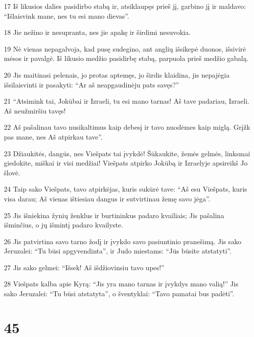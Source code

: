 \par 17 Iš likusios dalies pasidirbo stabą ir, atsiklaupęs prieš jį, garbino jį ir maldavo: “Išlaisvink mane, nes tu esi mano dievas”. 
\par 18 Jie nežino ir nesupranta, nes jie apakę ir širdimi nesuvokia. 
\par 19 Nė vienas nepagalvoja, kad pusę sudegino, ant anglių išsikepė duonos, išsivirė mėsos ir pavalgė. Iš likusio medžio pasidirbę stabą, parpuola prieš medžio gabalą. 
\par 20 Jis maitinasi pelenais, jo protas aptemęs, jo širdis klaidina, jis nepajėgia išsilaisvinti ir pasakyti: “Ar aš neapgaudinėju pats savęs?” 
\par 21 “Atsimink tai, Jokūbai ir Izraeli, tu esi mano tarnas! Aš tave padariau, Izraeli. Aš neužmiršiu tavęs! 
\par 22 Aš pašalinau tavo nusikaltimus kaip debesį ir tavo nuodėmes­ kaip miglą. Grįžk pas mane, nes Aš atpirkau tave”. 
\par 23 Džiaukitės, dangūs, nes Viešpats tai įvykdė! Šūkaukite, žemės gelmės, linksmai giedokite, miškai ir visi medžiai! Viešpats atpirko Jokūbą ir Izraelyje apsireikš Jo šlovė. 
\par 24 Taip sako Viešpats, tavo atpirkėjas, kuris sukūrė tave: “Aš esu Viešpats, kuris visa darau; Aš vienas ištiesiau dangus ir sutvirtinau žemę savo jėga”. 
\par 25 Jis išniekina žynių ženklus ir burtininkus padaro kvailiais; Jis pašalina išminčius, o jų išmintį padaro kvailyste. 
\par 26 Jis patvirtina savo tarno žodį ir įvykdo savo pasiuntinio pranešimą. Jis sako Jeruzalei: “Tu būsi apgyvendinta”, ir Judo miestams: “Jūs būsite atstatyti”. 
\par 27 Jis sako gelmei: “Išsek! Aš išdžiovinsiu tavo upes!” 
\par 28 Viešpats kalba apie Kyrą: “Jis yra mano tarnas ir įvykdys mano valią!” Jis sako Jeruzalei: “Tu būsi atstatyta”, o šventyklai: “Tavo pamatai bus padėti”.



\chapter{45}


